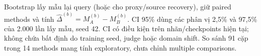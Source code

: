 Bootstrap lấy mẫu lại query (hoặc  cho proxy/source recovery), giữ paired methods và tính $\widehat\Delta^{(b)}=M_A^{(b)}-M_B^{(b)}$. CI 95\% dùng các phân vị 2,5\% và 97,5\% của 2.000 lần lấy mẫu, seed 42. CI có điều kiện trên nhãn/checkpoints hiện tại; không chứa bất định do training seed, judge hoặc domain shift. So sánh 91 cặp trong 14 methods mang tính exploratory, chưa chỉnh multiple comparisons.
